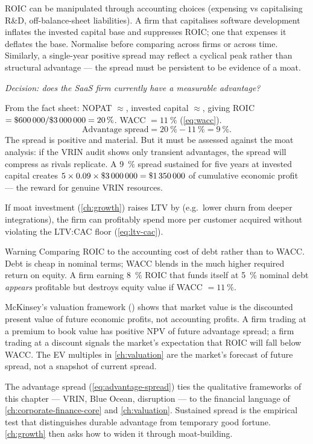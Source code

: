 ROIC can be manipulated through accounting choices (expensing vs capitalising R\&D, off-balance-sheet
liabilities). A firm that capitalises software development inflates the invested capital base
and suppresses ROIC; one that expenses it deflates the base. Normalise before comparing
across firms or across time. Similarly, a single-year positive spread may reflect a cyclical
peak rather than structural advantage --- the spread must be persistent to be evidence of a
moat.

\begin{example}
\emph{Decision: does the SaaS firm currently have a measurable advantage?}

From the fact sheet: NOPAT $\approx$, invested capital $\approx$,
giving ROIC $= \$\num{600000}/\$\num{3000000} = \qty{20}{\percent}$. WACC $= \qty{11}{\percent}$
(\cref{eq:wacc}).
\[
  \text{Advantage spread} = \qty{20}{\percent} - \qty{11}{\percent} = \qty{9}{\percent}.
\]
The spread is positive and material. But it must be assessed against the moat analysis:
if the VRIN audit shows only transient advantages, the spread will compress as rivals
replicate. A \qty{9}{\percent} spread sustained for five years at 
invested capital creates $5 \times 0.09 \times \$\num{3000000} = \$\num{1350000}$
of cumulative economic profit --- the reward for genuine VRIN resources.

If moat investment (\cref{ch:growth}) raises LTV by  (e.g.\ lower churn from
deeper integrations), the firm can profitably spend  more per customer
acquired without violating the LTV:CAC floor (\cref{eq:ltv-cac}).
\end{example}

\begin{admonition}{Warning}
Comparing ROIC to the accounting cost of debt rather than to WACC. Debt is cheap in nominal
terms; WACC blends in the much higher required return on equity. A firm earning
\qty{8}{\percent} ROIC that funds itself at \qty{5}{\percent} nominal debt \emph{appears}
profitable but destroys equity value if WACC $=\qty{11}{\percent}$.
\end{admonition}

McKinsey's valuation framework (\parencite{dranove7theconomics}) shows that market value
is the discounted present value of future economic profits, not accounting profits.
A firm trading at a premium to book value has positive NPV of future advantage spread;
a firm trading at a discount signals the market's expectation that ROIC will fall below WACC.
The EV multiples in \cref{ch:valuation} are the market's forecast of future spread, not
a snapshot of current spread.

The advantage spread (\cref{eq:advantage-spread}) ties the qualitative frameworks of this
chapter --- VRIN, Blue Ocean, disruption --- to the financial language of
\cref{ch:corporate-finance-core} and \cref{ch:valuation}. Sustained spread is the
empirical test that distinguishes durable advantage from temporary good fortune.
\cref{ch:growth} then asks how to widen it through moat-building.
